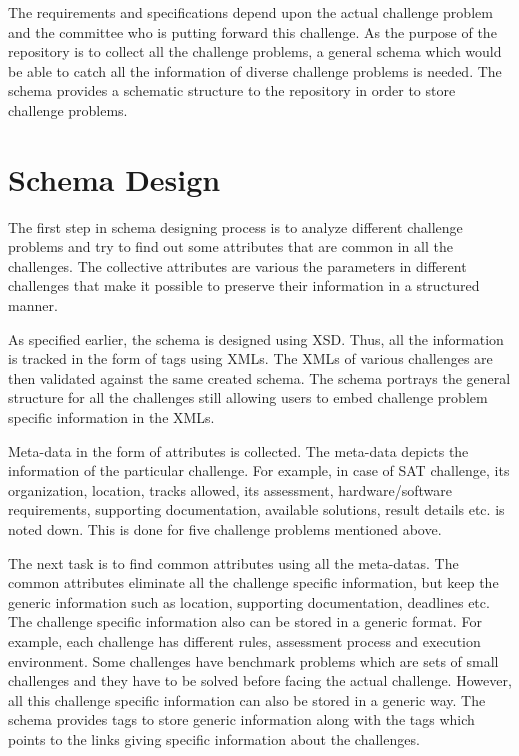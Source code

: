 \documentclass[11pt,letterpaper]{report}
\begin{document}
The requirements and specifications depend upon the actual challenge problem and the committee who is putting forward this challenge. As the purpose of the repository is to collect all the challenge problems, a general schema which would be able to catch all the information of diverse challenge problems is needed. The schema provides a schematic structure to the repository in order to store challenge problems.  

\section*{Schema Design} 
The first step in schema designing process is to analyze different challenge problems and try to find out some attributes that are common in all the challenges. The collective attributes are various the parameters in different challenges that make it possible to preserve their information in a structured manner. 

As specified earlier, the schema is designed using XSD. Thus, all the information is tracked in the form of tags using XMLs. The XMLs of various challenges are then validated against the same created schema. The schema portrays the general structure for all the challenges still allowing users to embed challenge problem specific information in the XMLs. 

Meta-data in the form of attributes is collected. The meta-data depicts the information of the particular challenge. For example, in case of SAT challenge, its organization, location, tracks allowed, its assessment, hardware/software requirements, supporting documentation, available solutions, result details etc. is noted down. This is done for five challenge problems mentioned above. 

The next task is to find common attributes using all the meta-datas. The common attributes eliminate all the challenge specific information, but keep the generic information such as location, supporting documentation, deadlines etc. The challenge specific information also can be stored in a generic format. For example, each challenge has different rules, assessment process and execution environment. Some challenges have benchmark problems which are sets of small challenges and they have to be solved before facing the actual challenge. However, all this challenge specific information can also be stored in a generic way. The schema provides tags to store generic information along with the tags which points to the links giving specific information about the challenges.
\end{document}
